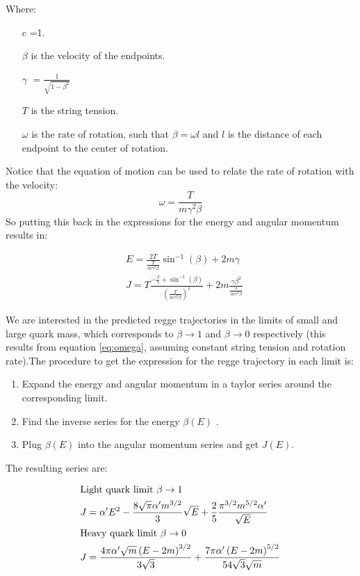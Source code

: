 \documentclass[11pt,a4paper]{article}
\begin{document}
Where:
\begin{itemize}
\item[c]=1.
\item[$\beta$] is the velocity of the endpoints.
\item[$\gamma$]$=\frac{1}{\sqrt{1-\beta^2}}$
\item[$T$] is the string tension.
\item[$\omega$] is the rate of rotation, such that $\beta=\omega l$ and $l$ is the distance of each endpoint to the center of rotation.
\end{itemize}

Notice that the equation of motion can be used to relate the rate of rotation with the velocity:
\begin{equation}
\label{eq:omega}
\omega=\frac{T}{m\gamma^2\beta}
\end{equation}
So putting this back in the expressions for the energy and angular momentum results in:

\begin{subequations}
\begin{align}
&E=\frac{2T}{\frac{T}{m\gamma^2\beta}}\sin^{-1}\left(\beta\right)+2m\gamma\\
&J=T\frac{-\frac{\beta}{\gamma}+\sin^{-1}\left(\beta\right)}{\left(\frac{T}{m\gamma^2\beta}\right)^{2}}+2m\frac{\gamma\beta^{2}}{\frac{T}{m\gamma^2\beta}}
\end{align}
\end{subequations}

We are interested in the predicted regge trajectories in the limits of small and large quark mass, which corresponds to $\beta\rightarrow1$ and $\beta\rightarrow0$ respectively (this results from equation \ref{eq:omega}, assuming constant string tension and rotation rate).The procedure to get the expression for the regge trajectory in each limit  is:
\begin{enumerate}
\item Expand the energy and angular momentum in a taylor series around the corresponding limit.
\item Find the inverse series for the energy $\beta\left(E\right)$ \cite{WolframSeriesReversion}.
\item Plug $\beta\left(E\right)$ into the angular momentum series and get $J\left(E\right)$.
\end{enumerate}

The resulting series are:

\begin{subequations}  
\begin{align}
&\text{Light quark limit }\beta\rightarrow1\notag\\
&J=\alpha' E^2-\frac{8 \sqrt{\pi } \alpha' m^{3/2}}{3}\sqrt{E}+\frac{2}{5}\frac{\pi^{3/2}m^{5/2}\alpha'}{\sqrt{E}} \\
&\text{Heavy quark limit }\beta\rightarrow0\notag\\
&J=\frac{4\pi\alpha'\sqrt{m} \left(E-2 m\right)^{3/2}}{3\sqrt{3}}+\frac{7\pi\alpha'  \left(E-2m\right)^{5/2}}{54\sqrt{3}\sqrt{m}}
\end{align}
\end{subequations}
\end{document}
